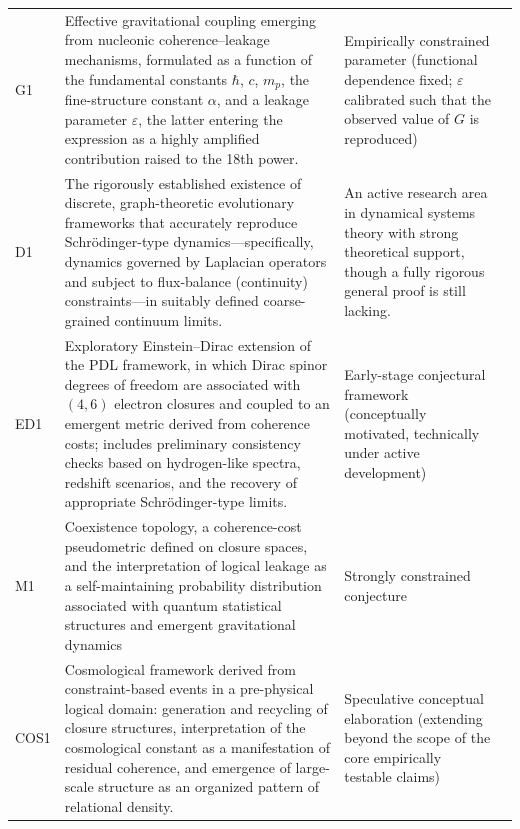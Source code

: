 \documentclass{article}
\begin{document}
\begin{longtable}{@{}p{0.7cm}p{7cm}L{5.6cm}p{2cm}@{}}
  G1 &
 Effective gravitational coupling emerging from nucleonic coherence–leakage mechanisms, formulated as a function of the fundamental constants $\hbar$, $c$, $m_p$, the fine-structure constant $\alpha$, and a leakage parameter $\varepsilon$, the latter entering the expression as a highly amplified contribution raised to the 18th power. &
  Empirically constrained parameter (functional dependence fixed; $\varepsilon$ calibrated such that the observed value of $G$ is reproduced) & \cite{PDL_Main_2026,Exponent_18_PDL_2026,PDL_position} \\[0.4em]

  D1 &  
  The rigorously established existence of discrete, graph-theoretic evolutionary frameworks that accurately reproduce Schrödinger-type dynamics—specifically, dynamics governed by Laplacian operators and subject to flux-balance (continuity) constraints—in suitably defined coarse-grained continuum limits. &  
  An active research area in dynamical systems theory with strong theoretical support, though a fully rigorous general proof is still lacking. & \cite{Coherence_Leakage_18_2026,Schrodinger_Sketch_v2_2026,PDL_position} \\[0.4em]

  ED1 & 
  Exploratory Einstein--Dirac extension of the PDL framework, in which Dirac spinor degrees of freedom are associated with $(4,6)$ electron closures and coupled to an emergent metric derived from coherence costs; includes preliminary consistency checks based on hydrogen-like spectra, redshift scenarios, and the recovery of appropriate Schr\"odinger-type limits. & 
  Early-stage conjectural framework (conceptually motivated, technically under active development) & \cite{Einstein_Dirac_PDL_2026,PDL_Main_2026,Coherence_Leakage_18_2026,Coherence_Leakage_18_2026} \\[0.4em]

  M1 &
  Coexistence topology, a coherence-cost pseudometric defined on closure spaces, and the interpretation of logical leakage as a self-maintaining probability distribution associated with quantum statistical structures and emergent gravitational dynamics &
  Strongly constrained conjecture & \cite{Coherence_Leakage_18_2026,PDL_position} \\[0.4em]

  COS1 & 
  Cosmological framework derived from constraint-based events in a pre-physical logical domain: generation and recycling of closure structures, interpretation of the cosmological constant as a manifestation of residual coherence, and emergence of large-scale structure as an organized pattern of relational density. & 
  Speculative conceptual elaboration (extending beyond the scope of the core empirically testable claims) & \cite{PDL_Main_2026,PDL_position} \\[0.4em]


\end{longtable}
\end{document}
